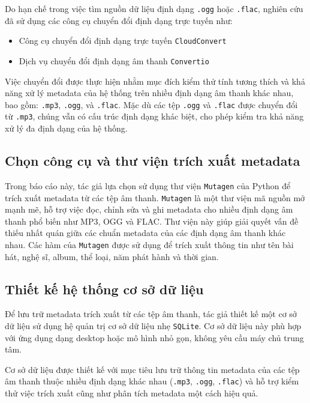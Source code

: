 \documentclass[conference]{IEEEtran}
\begin{document}
Do hạn chế trong việc tìm nguồn dữ liệu định dạng \texttt{.ogg} hoặc \texttt{.flac}, nghiên cứu đã sử dụng các công cụ chuyển đổi định dạng trực tuyến như:

\begin{itemize}
  \item Công cụ chuyển đổi định dạng trực tuyến \texttt{CloudConvert}
  \item Dịch vụ chuyển đổi định dạng âm thanh \texttt{Convertio}
\end{itemize}

Việc chuyển đổi được thực hiện nhằm mục đích kiểm thử tính tương thích 
và khả năng xử lý metadata của hệ thống trên nhiều định dạng âm thanh khác nhau,
 bao gồm: \texttt{.mp3}, \texttt{.ogg}, và \texttt{.flac}. 
 Mặc dù các tệp \texttt{.ogg} và \texttt{.flac} được chuyển đổi từ \texttt{.mp3}, 
 chúng vẫn có cấu trúc định dạng khác biệt, cho phép kiểm tra khả năng xử lý đa định dạng của hệ thống.

\subsection{Chọn công cụ và thư viện trích xuất metadata}
Trong báo cáo này, tác giả lựa chọn sử dụng thư viện \texttt{Mutagen} của Python
 để trích xuất metadata từ các tệp âm thanh. \texttt{Mutagen} là một thư viện mã nguồn mở
  mạnh mẽ, hỗ trợ việc đọc, chỉnh sửa và ghi metadata cho nhiều định dạng âm thanh phổ biến 
  như MP3, OGG và FLAC. Thư viện này giúp giải quyết vấn đề thiếu nhất quán giữa các chuẩn metadata 
  của các định dạng âm thanh khác nhau. Các hàm của \texttt{Mutagen} được sử dụng để trích xuất
   thông tin như tên bài hát, nghệ sĩ, album, thể loại, năm phát hành và thời gian.

\subsection{Thiết kế hệ thống cơ sở dữ liệu}
Để lưu trữ metadata trích xuất từ các tệp âm thanh, tác giả thiết kế một cơ sở dữ liệu sử dụng hệ quản trị cơ sở dữ liệu nhẹ \texttt{SQLite}. 
Cơ sở dữ liệu này phù hợp với ứng dụng dạng desktop hoặc mô hình nhỏ gọn, không yêu cầu máy chủ trung tâm.

Cơ sở dữ liệu được thiết kế với mục tiêu lưu trữ thông tin metadata của các tệp âm thanh thuộc nhiều định dạng khác nhau (\texttt{.mp3}, 
\texttt{.ogg}, \texttt{.flac}) và hỗ trợ kiểm thử việc trích xuất cũng như phân tích metadata một cách hiệu quả.
\end{document}
